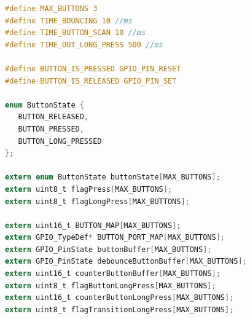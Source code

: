 \documentclass[twoside, final]{hcmut_report}
\begin{document}
\begin{lstlisting}[caption=Define macro and button variable, language=C]
#define MAX_BUTTONS 3
#define TIME_BOUNCING 10 //ms
#define TIME_BUTTON_SCAN 10 //ms
#define TIME_OUT_LONG_PRESS 500 //ms

#define BUTTON_IS_PRESSED GPIO_PIN_RESET
#define BUTTON_IS_RELEASED GPIO_PIN_SET

enum ButtonState {
   BUTTON_RELEASED,
   BUTTON_PRESSED,
   BUTTON_LONG_PRESSED
};

extern enum ButtonState buttonState[MAX_BUTTONS];
extern uint8_t flagPress[MAX_BUTTONS];
extern uint8_t flagLongPress[MAX_BUTTONS];

extern uint16_t BUTTON_MAP[MAX_BUTTONS];
extern GPIO_TypeDef* BUTTON_PORT_MAP[MAX_BUTTONS];
extern GPIO_PinState buttonBuffer[MAX_BUTTONS];
extern GPIO_PinState debounceButtonBuffer[MAX_BUTTONS];
extern uint16_t counterButtonBuffer[MAX_BUTTONS];
extern uint8_t flagButtonLongPress[MAX_BUTTONS];
extern uint16_t counterButtonLongPress[MAX_BUTTONS];
extern uint8_t flagTransitionLongPress[MAX_BUTTONS];
\end{lstlisting}
\end{document}
